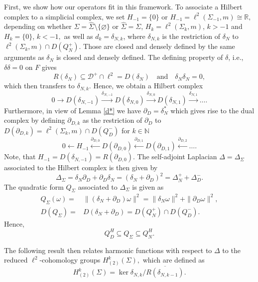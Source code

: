 \documentclass[10pt]{amsart}
\theoremstyle{definition}
\begin{document}
First, we show how our operators fit in this framework. To associate a Hilbert complex to a simplicial complex, we set $H_{-1} = \lbrace0\rbrace$ or $H_{-1} = \ell^2(\Sigma_{-1},m)\cong\mathbb{R},$ depending on whether $\Sigma=\hat{\Sigma}\setminus \{\varnothing\}$ or $\hat\Sigma = \Sigma$, $H_k = \ell^2(\Sigma_k,m)$, $k> -1$ and $H_k = \lbrace 0\rbrace$, $k<-1,$ as well as $d_k = \delta_{N,k}$, where $\delta_{N,k}$ is the restriction of $\delta_N$ to $\ell^2(\Sigma_k,m)\cap D(Q^+_N).$ Those are closed and densely defined by the same arguments as $\delta_N$ is closed and densely defined.
The defining property of $\delta$, i.e., $\delta\delta=0$ on $F$ gives $$R(\delta_{N})  \subseteq \mathcal{D}^{+}\cap \ell^{2}= D(\delta_{N})\quad \mbox{and}\quad \delta_{N}\delta_{N}=0, $$ which then transfers to $\delta_{N,k}$. Hence, we obtain a Hilbert complex
$$0\rightarrow D(\delta_{N,-1})\xrightarrow{\delta_{N,-1}}D(\delta_{N,0})\xrightarrow{\delta_{N,0}}D(\delta_{N,1})\xrightarrow{\delta_{N,1}}\ldots.$$ 
Furthermore, in view of Lemma \ref{d*}
we have $\partial_{D}=\delta_{N}^{*}$ which gives rise to the dual complex by defining $\partial_{D,k}$ as the restriction of $\partial_D$ to $D(\partial_{D,k})=\ell^2(\Sigma_k,m)\cap D(Q^-_{D})$ for $k\in\mathbb{N}$
$$0\leftarrow H_{-1}\xleftarrow{\partial_{D,0}}D(\partial_{D,0})\xleftarrow{\partial_{D,1}}D(\partial_{D,1})\xleftarrow{\partial_{D,2}}\ldots.$$
Note, that $H_{-1} = D(\delta_{N,-1}) = R(\partial_{D,0}).$
The self-adjoint Laplacian $\Delta=\Delta_{\Sigma}$ associated to the Hilbert complex is then given by
$$\Delta_{\Sigma} = \delta_N\partial_D+\partial_D\delta_N = (\delta_N+\partial_D)^2 = \Delta^+_N+\Delta^-_{D}.$$
The quadratic form $Q_{\Sigma}$ associated to $\Delta_{\Sigma}$ is given
as 
\begin{align*}
	Q_{\Sigma}(\omega)=&\|(\delta_{N}+\partial_{D})\omega\|^{2}=\|\delta_{N}\omega\|^{2}+\|\partial_{D}\omega\|^{2},\\ D(Q_{\Sigma})=&D(\delta_{N}+\partial_{D})=D(Q_{N}^{+})\cap D(Q_{D}^{-}).
\end{align*}
Hence,
\begin{equation*}
	Q_{D}^{H}\subseteq Q_{\Sigma}\subseteq Q_{N}^{H}.
\end{equation*}



The following result then relates harmonic functions with respect to $\Delta$ to the reduced $\ell^2$-cohomology groups $H^k_{(2)}(\Sigma),$ which are defined as 
$$H^k_{(2)}(\Sigma) = \ker\delta_{N,k}\slash \overline{R(\delta_{N,k-1})}.$$
\end{document}
